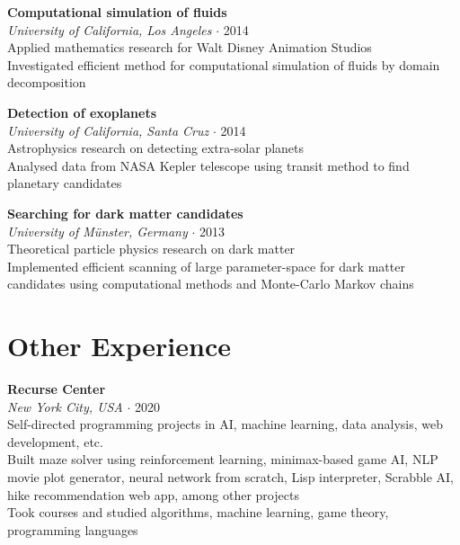 \documentclass[12pt,a4paper]{article}
\newcommand{\middot}{\boldsymbol{\cdot}}
\begin{document}
\begin{flushleft}
\textbf{Computational simulation of fluids} \\
\textit{University of California, Los Angeles} $\middot$ 2014 \\ 
Applied mathematics research for Walt Disney Animation Studios \\
Investigated efficient method for computational simulation of fluids by domain decomposition
\end{flushleft}

\vspace{1mm}

\begin{flushleft}
\textbf{Detection of exoplanets} \\
\textit{University of California, Santa Cruz} $\middot$ 2014 \\
Astrophysics research on detecting extra-solar planets \\
Analysed data from NASA Kepler telescope using transit method to find planetary candidates 
\end{flushleft}

\vspace{1mm}

\begin{flushleft}
\textbf{Searching for dark matter candidates} \\
\textit{University of M\"unster, Germany} $\middot$ 2013 \\
Theoretical particle physics research on dark matter \\
Implemented efficient scanning of large parameter-space for dark matter candidates using computational methods and Monte-Carlo Markov chains 
\end{flushleft}

\vspace{1mm}

\section*{Other Experience \sout{\hfill}}

\vspace{3mm}

\begin{flushleft}
\textbf{Recurse Center} \\
\textit{New York City, USA} $\middot$ 2020 \\ 
Self-directed programming projects in AI, machine learning, data analysis, web development, etc. \\
Built maze solver using reinforcement learning, minimax-based game AI, NLP movie plot generator, neural network from scratch, Lisp interpreter, Scrabble AI, hike recommendation web app, among other projects \\ 
Took courses and studied algorithms, machine learning, game theory, programming languages 
\end{flushleft}
\end{document}
